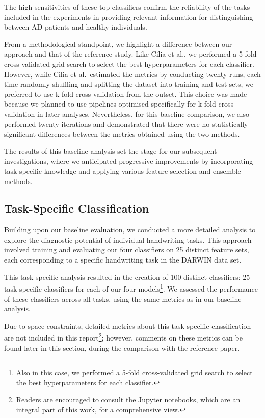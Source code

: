 \documentclass[a4paper, 11pt]{article}
\begin{document}
The high sensitivities of these top classifiers confirm the reliability of the tasks included in the experiments in providing relevant information for distinguishing between AD patients and healthy individuals.

From a methodological standpoint, we highlight a difference between our approach and that of the reference study. Like Cilia et al., we performed a 5-fold cross-validated grid search to select the best hyperparameters for each classifier. However, while Cilia et al.~estimated the metrics by conducting twenty runs, each time randomly shuffling and splitting the dataset into training and test sets, we preferred to use k-fold cross-validation from the outset. This choice was made because we planned to use pipelines optimised specifically for k-fold cross-validation in later analyses. Nevertheless, for this baseline comparison, we also performed twenty iterations and demonstrated that there were no statistically significant differences between the metrics obtained using the two methods.

The results of this baseline analysis set the stage for our subsequent investigations, where we anticipated progressive improvements by incorporating task-specific knowledge and applying various feature selection and ensemble methods.

\subsection{Task-Specific Classification} \label{sec:task-by-task}
Building upon our baseline evaluation, we conducted a more detailed analysis to explore the diagnostic potential of individual handwriting tasks. This approach involved training and evaluating our four classifiers on 25 distinct feature sets, each corresponding to a specific handwriting task in the DARWIN data set.

This task-specific analysis resulted in the creation of 100 distinct classifiers: 25 task-specific classifiers for each of our four models\footnote{Also in this case, we performed a 5-fold cross-validated grid search to select the best hyperparameters for each classifier.}. We assessed the performance of these classifiers across all tasks, using the same metrics as in our baseline analysis. 

Due to space constraints, detailed metrics about this task-specific classification are not included in this report\footnote{Readers are encouraged to consult the Jupyter notebooks, which are an integral part of this work, for a comprehensive view.}; however, comments on these metrics can be found later in this section, during the comparison with the reference paper. 
\end{document}
